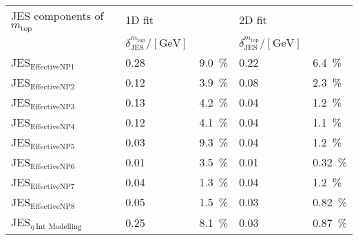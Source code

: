 \begin{center}
	\label{tab:errorx1}
	
	
	\vspace{0.3cm}	
	
\begin{tabular}{>{}m{5.0cm}>{}m{2.5cm}>{}m{2.0cm} >{}m{2.5cm}>{}m{1.0cm}} \toprule
		
JES components of $m_{\text{top}}$&  \hspace{1.2cm} 1D fit&&{\centering  \hspace{1.2cm} 2D fit}\\
	& $\delta_{ \text{JES}}^{m_{\text{top}}} / [\text{GeV}]$ & & $\delta_{ \text{JES}}^{m_{\text{top}}} / [\text{GeV}]$ &\\
\midrule

		
		
JES$_{ \text{EffectiveNP1} } $ & 0.28 &  9.0~\% & 0.22 &  6.4~\%\\


JES$_{\text{EffectiveNP2}}$ & 0.12 &  3.9~\% & 0.08 &  2.3~\%\\


JES$_{\text{EffectiveNP3}}$ & 0.13 &  4.2~\% & 0.04 &   1.2~\%\\


JES$_{\text{EffectiveNP4 }}$& 0.12 &  4.1~\% &  0.04 &  1.1~\% \\


JES$_{\text{EffectiveNP5}}$ & 0.03 & 9.3~\% & 0.04 &  1.2~\% \\


JES$_{\text{EffectiveNP6 }}$& 0.01 &  3.5~\% & 0.01  &  0.32~\% \\


JES$_{\text{EffectiveNP7}}$ & 0.04 &  1.3~\% &0.04 &  1.2~\%\\


JES$_{\text{EffectiveNP8}}$ & 0.05 &  1.5~\% & 0.03 &  0.82~\% \\

JES$_{\eta ~\text{Int Modelling}}$ & 0.25 &  8.1~\% & 0.03 &  0.87~\% \\



\end{tabular}
\end{center}
